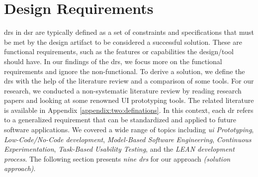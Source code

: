 \section{Design Requirements}
\label{design:section:designReqs}
\ac{dr}s in \ac{dsr} are typically defined as a set of constraints and specifications that must be met by the design artifact to be considered a successful solution. 
These are functional requirements, such as the features or capabilities the design/tool should have.
In our findings of the \ac{dr}s, we focus more on the functional requirements and ignore the non-functional.
To derive a solution, we define the \ac{dr}s with the help of the literature review and a comparison of some tools.
For our research, we conducted a non-systematic literature review by reading research papers and looking at some renowned UI prototyping tools. 
The related literature is available in Appendix \ref{appendix:two:definations}.
In this context, each \ac{dr} refers to a generalized requirement that can be standardized and applied to future software applications.
We covered a wide range of topics including \textit{\ac{ui} Prototyping}, \textit{Low-Code/No-Code development}, \textit{Model-Based Software Engineering}, \textit{Continuous Experimentation}, \textit{Task-Based Usability Testing}, and the \textit{LEAN development process}.
The following section presents \textit{nine \ac{dr}s} for our approach \textit{(solution approach)}.
